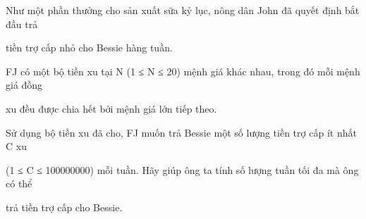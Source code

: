 Như một phần thưởng cho sản xuất sữa kỷ lục, nông dân John đã quyết định bắt đầu trả  

   tiền trợ cấp nhỏ cho Bessie hàng tuần.  

   FJ có một bộ tiền xu tại N (1 ≤ N ≤ 20) mệnh giá khác nhau, trong đó mỗi mệnh giá đồng  

   xu đều được chia hết bởi mệnh giá lớn tiếp theo.  

   Sử dụng bộ tiền xu đã cho, FJ muốn trả Bessie một số lượng tiền trợ cấp ít nhất C xu  

   (1 ≤ C ≤ 100000000) mỗi tuần. Hãy giúp ông ta tính số lượng tuần tối đa mà ông có thể  

   trả tiền trợ cấp cho Bessie.